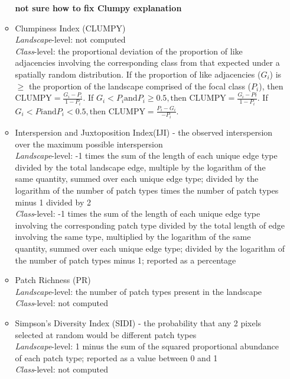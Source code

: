 \begin{itemize}
\begin{itemize}
		\textbf{not sure how to fix Clumpy explanation}		
		\item Clumpiness Index (CLUMPY)\\
		\emph{Landscape}-level: not computed  	\\
		\emph{Class}-level: the proportional deviation of the proportion of like adjacencies involving the corresponding class from that expected under a spatially random distribution. If the proportion of like adjacencies ($G_i$) is $\geq$ the proportion of the landscape comprised of the focal class ($P_i$), then $\text{CLUMPY} = \frac{G_i - P_i}{1 - P_i}$. If $G_i < P_i \text{and} P_i \geq 0.5, \text{then CLUMPY} = \frac{G_i - Pi}{1 - P_i}$. If $G_i < Pi \text{and} P_i < 0.5, \text{then CLUMPY} = \frac{P_i - G_i}{-P_i}$.	\\
		
		\item Interspersion and Juxtoposition Index(IJI) - the observed interspersion over the maximum possible interspersion\\
		\emph{Landscape}-level: -1 times the sum of the length of each unique edge type divided by the total landscape edge, multiple by the logarithm of the same quantity, summed over each unique edge type;  divided by the logarithm of the number of patch types times the number of patch types minus 1 divided by 2 	\\
		\emph{Class}-level: -1 times the sum of the length of each unique edge type involving the corresponding patch type divided by the total length of edge involving the same type, multiplied by the logarithm of the same quantity, summed over each unique edge type; divided by the logarithm of the number of patch types minus 1; reported as a percentage	\\
		
		\item Patch Richness (PR)\\
		\emph{Landscape}-level: the number of patch types present in the landscape	\\
		\emph{Class}-level: not computed \\
		
		\item Simpson's Diversity Index (SIDI) - the probability that any 2 pixels selected at random would be different patch types\\
		\emph{Landscape}-level: 1 minus the sum of the squared proportional abundance of each patch type; reported as a value between 0 and 1	\\
		\emph{Class}-level: not computed\\
		

\end{itemize}
\end{itemize}
